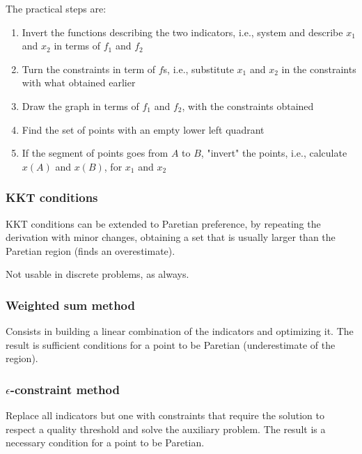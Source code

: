 The practical steps are: 
\begin{enumerate}
    \item Invert the functions describing the two indicators, i.e., system and describe $x_1$ and $x_2$ in terms of $f_1$ and $f_2$
    
    \item Turn the constraints in term of $f$s, i.e., substitute $x_1$ and $x_2$ in the constraints with what obtained earlier
    
    \item Draw the graph in terms of $f_1$ and $f_2$, with the constraints obtained
    
    \item Find the set of points with an empty lower left quadrant
    
    \item If the segment of points goes from $A$ to $B$, "invert" the points, i.e., calculate $x(A)$ and $x(B)$, for $x_1$ and $x_2$
\end{enumerate}

\subsubsection{KKT conditions}

KKT conditions can be extended to Paretian preference, by repeating the derivation with minor changes, obtaining a set that is usually larger than the Paretian region (finds an overestimate).

Not usable in discrete problems, as always.  

\subsubsection{Weighted sum method}

Consists in building a linear combination of the indicators and optimizing it. The result is sufficient conditions for a point to be Paretian (underestimate of the region).


\subsubsection{$\epsilon$-constraint method}

Replace all indicators but one with constraints that require the solution to respect a quality threshold and solve the auxiliary problem. The result is a necessary condition for a point to be Paretian.

